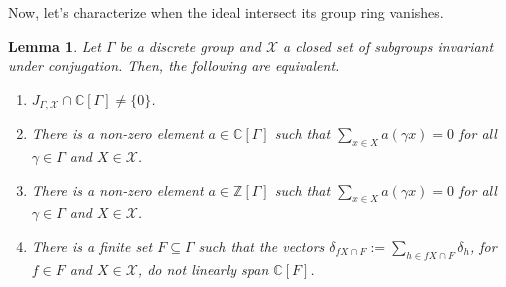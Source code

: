\documentclass[a4paper, 12pt]{amsart}
\newtheorem{lem}[thm]{Lemma}
\theoremstyle{definition}
\theoremstyle{remark}
\numberwithin{equation}{section}
\begin{document}
Now, let's characterize when the ideal intersect its group ring vanishes.

\begin{lem}
\label{lem:alggroupidealchar}
Let $\Gamma$ be a discrete group and $\mathcal{X}$ a closed set of subgroups invariant under conjugation. Then, the following are equivalent.

\begin{enumerate}
    \item $J_{\Gamma,\mathcal{X}}\cap \mathbb{C}[\Gamma]\neq \{0\}$.
    \item There is a non-zero element $a\in \mathbb{C}[\Gamma]$ such that $\sum_{x\in X}a(\gamma x) = 0$ for all $\gamma\in \Gamma$ and $X\in\mathcal{X}$.
    \item There is a non-zero element $a\in \mathbb{Z}[\Gamma]$ such that $\sum_{x\in X}a(\gamma x) = 0$ for all $\gamma\in \Gamma$ and $X\in\mathcal{X}$.
    \item There is a finite set $F\subseteq \Gamma$ such that the vectors $\delta_{fX\cap F}:= \sum_{h\in fX\cap F}\delta_{h}$, for $f\in F$ and $X\in\mathcal{X}$, do not linearly span $\mathbb{C}[F]$.
\end{enumerate}
\end{lem}
\end{document}
